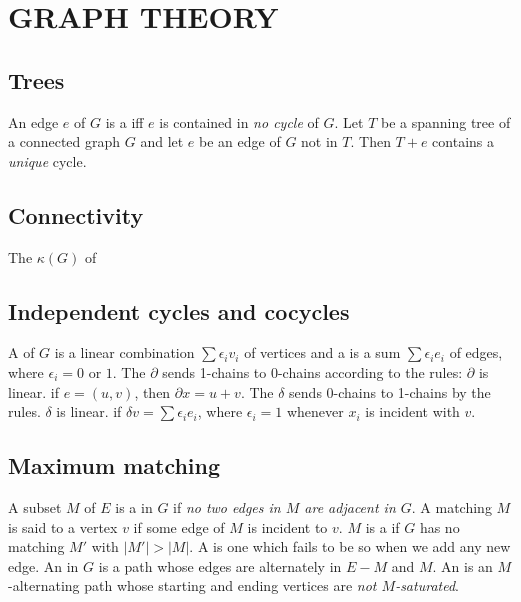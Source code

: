 \section{GRAPH THEORY}
\subsection{Trees}
\bit
\w An edge $e$ of $G$ is a  iff $e$ is contained in {\em no
  cycle\/} of $G$. 
\w Let $T$ be a spanning tree of a connected graph $G$ and let $e$ be an edge
of $G$ not in $T$. Then $T + e$ contains a {\em unique\/} cycle.
\eit

\subsection{Connectivity}
\bit
\w The  $\kappa(G)$ of 
\eit


\subsection{Independent cycles and cocycles}
\bit
\w A  of $G$ is a linear combination $\sum \epsilon_i v_i$
of vertices and a  is a sum $\sum \epsilon_i e_i$ of edges,
where $\epsilon_i = 0$ or $1$. 
\w The  $\partial$ sends 1-chains to 0-chains according
to the rules:
  \ben
  \w [(a)] $\partial$ is linear.
  \w [(b)] if $e = (u, v)$, then $\partial x = u + v$.
  \een
\w The  $\delta$ sends 0-chains to 1-chains by the
rules. 
  \ben
  \w [(a)] $\delta$ is linear.
  \w [(b)] if $\delta v = \sum \epsilon_i e_i$, where $\epsilon_i = 1$
  whenever $x_i$ is incident with $v$.
  \een
\eit


\subsection{Maximum matching}
\bit
\w A subset $M$ of $E$ is a  in $G$ if {\em no two edges in $M$
  are adjacent in $G$\/}.  A matching $M$ is said to  a vertex
$v$ if some edge of $M$ is incident to $v$. 
\w $M$ is a  if $G$ has no matching $M'$ with $|M'| >
|M|$. A  is one which fails to be so when we add any new
edge. 
\w An  in $G$ is a path whose edges are alternately 
in $E - M$ and $M$. An  is an $M$-alternating path
whose starting and ending vertices are {\em not $M$-saturated\/}.

